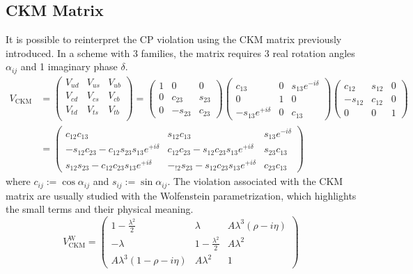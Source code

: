 \documentclass[10.75pt,a4paper,openright,bottom=2cm]{article}
\begin{document}
\subsection{CKM Matrix}
It is possible to reinterpret the CP violation using the CKM matrix previously introduced. In a scheme with 3 families, the matrix requires 3 real rotation angles $\alpha_{ij}$ and 1 imaginary phase $\delta$.
\begin{align*}
V_{\text{CKM}}&=\begin{pmatrix}
    V_{ud} & V_{us} & V_{ub}\\
    V_{cd} & V_{cs} & V_{cb}\\
    V_{td} & V_{ts} & V_{tb}\\
\end{pmatrix}=\begin{pmatrix}
    1 & 0 & 0\\
    0 & c_{23} & s_{23}\\
    0 & -s_{23} & c_{23}
\end{pmatrix}
\begin{pmatrix}
    c_{13} & 0 & s_{13}e^{-i\delta}\\
    0 & 1 & 0\\
    -s_{13}e^{+i\delta} & 0 & c_{13}
\end{pmatrix}
\begin{pmatrix}
    c_{12} & s_{12} & 0\\
    -s_{12} & c_{12} & 0\\
    0 & 0 & 1
\end{pmatrix}\\
&=\begin{pmatrix}
    c_{12}c_{13} & s_{12}c_{13} & s_{13}e^{-i\delta}\\
    -s_{12}c_{23}-c_{12}s_{23}s_{13}e^{+i\delta} & c_{12}c_{23}-s_{12}c_{23}s_{13}e^{+i\delta} & s_{23}c_{13}\\
    s_{12}s_{23}-c_{12}c_{23}s_{13}e^{+i\delta} & -_{!2}s_{23}-s_{12}c_{23}s_{13}e^{+i\delta} & c_{23}c_{13}
\end{pmatrix}
\end{align*}
where $c_{ij}:=\cos\alpha_{ij}$ and $s_{ij}:=\sin\alpha_{ij}$. The violation associated with the CKM matrix are usually studied with the Wolfenstein parametrization, which highlights the small terms and their physical meaning.
\[
V_{\text{CKM}}^{\text{W}}=\begin{pmatrix}
    1-\frac{\lambda^2}{2} & \lambda & A\lambda^3(\rho-i\eta)\\
    -\lambda & 1-\frac{\lambda^2}{2} & A\lambda^2\\
    A\lambda^3(1-\rho-i\eta) & A\lambda^2 & 1
\end{pmatrix}
\]
\end{document}
